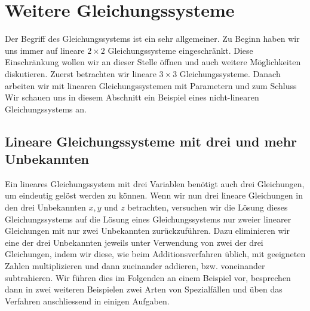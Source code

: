 \documentclass[11pt,oneside]{article}
\begin{document}
\section{Weitere Gleichungssysteme}
	Der Begriff des Gleichungssystems ist ein sehr allgemeiner. Zu Beginn haben wir uns immer auf lineare $2\times2$ Gleichungssysteme eingeschränkt. Diese Einschränkung wollen wir an dieser Stelle öffnen und auch weitere Möglichkeiten diskutieren. Zuerst betrachten wir lineare $3\times3$ Gleichungssysteme. Danach arbeiten wir mit linearen Gleichungssystemen mit Parametern und zum Schluss  Wir schauen uns in diesem Abschnitt ein Beispiel eines nicht-linearen Gleichungssystems an.

\subsection{Lineare Gleichungssysteme mit drei und mehr Unbekannten}
	Ein lineares Gleichungssystem mit drei Variablen benötigt auch drei Gleichungen, um eindeutig gelöst werden zu können. Wenn wir nun drei lineare Gleichungen in den drei Unbekannten $x,y$ und $z$ betrachten, versuchen wir die Lösung dieses Gleichungssystems auf die Lösung eines Gleichungssystems nur zweier linearer Gleichungen mit nur zwei Unbekannten zurückzuführen.\vspace{5pt}\newline
	Dazu eliminieren wir eine der drei Unbekannten jeweils unter Verwendung von zwei der drei Gleichungen, indem wir diese, wie beim Additionsverfahren üblich, mit geeigneten Zahlen multiplizieren und dann zueinander addieren, bzw. voneinander subtrahieren.\vspace*{5pt}\newline
	Wir führen dies im Folgenden an einem Beispiel vor, besprechen dann in zwei weiteren Beispielen zwei Arten von Spezialfällen und üben das Verfahren anschliessend in einigen Aufgaben.
\end{document}
